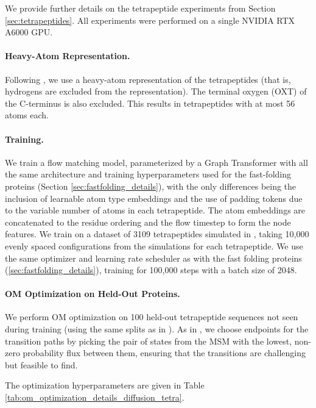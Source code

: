 We provide further details on the tetrapeptide experiments from Section \ref{sec:tetrapeptides}. All experiments were performed on a single NVIDIA RTX A6000 GPU.  

\paragraph{Heavy-Atom Representation.} Following \citet{jing2024generative}, we use a heavy-atom representation of the tetrapeptides (that is, hydrogens are excluded from the representation). The terminal oxygen (OXT) of the C-terminus is also excluded. This results in tetrapeptides with at most 56 atoms each. 

\paragraph{Training.} We train a flow matching model, parameterized by a Graph Transformer with all the same architecture and training hyperparameters used for the fast-folding proteins (Section \ref{sec:fastfolding_details}), with the only differences being the inclusion of learnable atom type embeddings and the use of padding tokens due to the variable number of atoms in each tetrapeptide. The atom embeddings are concatenated to the residue ordering and the flow timestep to form the node features. We train on a dataset of 3109 tetrapeptides simulated in \cite{jing2024generative}, taking 10,000 evenly spaced configurations from the simulations for each tetrapeptide. We use the same optimizer and learning rate scheduler as with the fast folding proteins (\ref{sec:fastfolding_details}), training for 100,000 steps with a batch size of 2048. 

\paragraph{OM Optimization on Held-Out Proteins.} We perform OM optimization on 100 held-out tetrapeptide sequences not seen during training (using the same splits as in \cite{jing2024generative}). As in \citet{jing2024generative}, we choose endpoints for the transition paths by picking the pair of states from the MSM with the lowest, non-zero probability flux between them, ensuring that the transitions are challenging but feasible to find. 

The optimization hyperparameters are given in Table \ref{tab:om_optimization_details_diffusion_tetra}.

